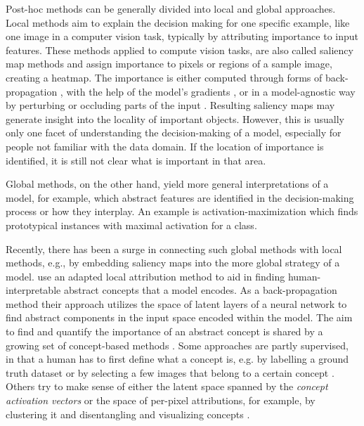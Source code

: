 Post-hoc methods can be generally divided into local and global approaches. Local methods aim to explain the decision making for one specific example, like one image in a computer vision task, typically by attributing importance to input features. 
These methods applied to compute vision tasks, are also called saliency map methods and assign importance to pixels or regions of a sample image, creating a heatmap. 
The importance is either computed through forms of back-propagation \citep{Bach2015,Zhang2016,Kindermans2017}, with the help of the model's gradients \citep{Sundararajan2017,Smilkov2017}, or in a model-agnostic way by perturbing or occluding parts of the input \citep{Lundberg2017,Zeiler2013,Zintgraf2017,Agarwal2020}. Resulting saliency maps may generate insight into the locality of important objects. However, this is usually only one facet of understanding the decision-making of a model, especially for people not familiar with the data domain. If the location of importance is identified, it is still not clear what is important in that area.   

Global methods, on the other hand, yield more general interpretations of a model, for example, which abstract features are identified in the decision-making process or how they interplay. An example is activation-maximization \cite{Nguyen2016} which finds prototypical instances with maximal activation for a class. 

Recently, there has been a surge in connecting such global methods with local methods, e.g., by embedding saliency maps into the more global strategy of a model. \cite{Achtibat2022} use an adapted local attribution method to aid in finding human-interpretable abstract concepts that a model encodes. As a back-propagation method their approach utilizes the space of latent layers of a neural network to find abstract components in the input space encoded within the model. The aim to find and quantify the importance of an abstract concept is shared by a growing set of concept-based methods \citep{Bau2017,Bau2020,Kim2018, Ghorbani2019, Zhang2021, Fel2023a}. 
Some approaches are partly supervised, in that a human has to first define what a concept is, e.g. by labelling a ground truth dataset or by selecting a few images that belong to a certain concept \citep{Kim2018, Singla2022}. Others try to make sense of either the latent space spanned by the \textit{concept activation vectors} or the space of per-pixel attributions, for example, by clustering it \citep{Lapuschkin2019,Vielhaben2023} and disentangling and visualizing concepts  \citep{Ghorbani2019,Zhang2021,Leemann2023,Fel2023,Chormai2022, Singla2022}.


